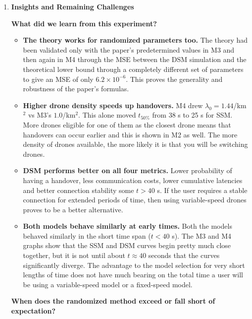 \documentclass[11pt]{article}
\newcommand{\subquestion}[1]{
    \vspace{0.3cm}
    \noindent\textbf{#1}
    \vspace{0.1cm}
}
\begin{document}
\begin{enumerate}[label=\textbf{Scribe Question \arabic*:}, leftmargin=*, itemsep=1.5em]
\newpage
\item \textbf{Insights and Remaining Challenges}

\subquestion{What did we learn from this experiment?}

\begin{itemize}[leftmargin=*, itemsep=0.4em]
    \item \textbf{The theory works for randomized parameters too.} The theory had been validated
          only with the paper's predetermined values in M3 and then again in M4 through the MSE
          between the DSM simulation and the theoretical lower bound through a completely different
          set of parameters to give an MSE of only $6.2 \times 10^{-6}$. This proves the generality
          and robustness of the paper's formulas.

    \item \textbf{Higher drone density speeds up handovers.} M4 drew $\lambda_0 = 1.44$/km$^2$
          vs M3's $1.0$/km$^2$. This alone moved $t_{50\%}$ from 38 s to 25 s for SSM. More drones
          eligible for one of them as the closest drone means that handovers can occur earlier and
          this is shown in M2 as well. The more density of drones available, the more likely it is that
          you will be switching drones.

    \item \textbf{DSM performs better on all four metrics.} Lower probability of having a handover,
          less communication costs, lower cumulative latencies and better connection stability some
          $t > 40$ s. If the user requires a stable connection for extended periods of time, then using
          variable-speed drones proves to be a better alternative.

    \item \textbf{Both models behave similarly at early times.} Both the models behaved similarly
          in the short time span ($t < 40$ s). The M3 and M4 graphs show that the SSM and DSM
          curves begin pretty much close together, but it is not until about $t \approx 40$ seconds
          that the curves significantly diverge. The advantage to the model selection for very short
          lengths of time does not have much bearing on the total time a user will be using a
          variable-speed model or a fixed-speed model.
\end{itemize}

\subquestion{When does the randomized method exceed or fall short of expectation?}


\end{enumerate}
\end{document}
